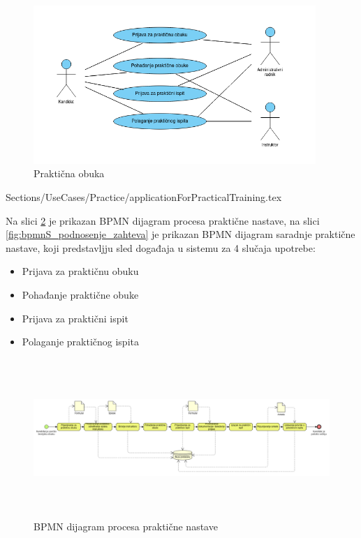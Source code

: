 \begin{figure}[H]
    \begin{center}
        \includegraphics[width=107mm, height=60mm]{Diagrams/prakticna_obuka.png}
    \end{center}
    \caption {Praktična obuka}
    \label{usecase_praktična obuka}

\end{figure}

 {Sections/UseCases/Practice/applicationForPracticalTraining.tex}







Na slici \ref{fig:bpmnP_podnosenje_zahteva} je prikazan BPMN dijagram procesa praktične nastave, na slici \ref{fig:bpmnS_podnosenje_zahteva} je prikazan BPMN dijagram saradnje praktične nastave, koji predstavljju sled događaja u sistemu za 4 slučaja upotrebe:
\begin{itemize}
    \item Prijava za praktičnu obuku
    \item Pohađanje praktične obuke
    \item Prijava za praktični ispit
    \item Polaganje praktičnog ispita
\end{itemize}

\begin{figure}[H]
    \begin{center}
        \includegraphics[width=120mm, height=60mm]{Diagrams/bpmnP_prakticna_nastava.png}
    \end{center}
    \caption {BPMN dijagram procesa praktične nastave}
    \label{fig:bpmnP_podnosenje_zahteva}

\end{figure}

